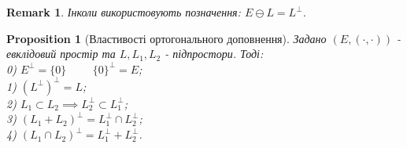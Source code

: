 \documentclass[a4paper, 10pt]{article}
\theoremstyle{theoremdd}
\newtheorem{proposition}[theorem]{Proposition}
\newtheorem{remark}[theorem]{Remark}
\begin{document}
\begin{remark}
Інколи використовують позначення: $E \ominus L = L^{\perp}$.
\end{remark}

\begin{proposition}[Властивості ортогонального доповнення]
Задано $(E,(\cdot,\cdot))$ - евклідовий простір та $L,L_1,L_2$ - підпростори. Тоді:\\
0) $E^{\perp} = \{0\} \hspace{1cm} \{0\}^{\perp} = E$;\\
1) $(L^{\perp})^{\perp} = L$;\\
2) $L_1 \subset L_2 \implies L_2^{\perp} \subset L_1^{\perp}$;\\
3) $(L_1+L_2)^{\perp} = L_1^{\perp} \cap L_2^{\perp}$;\\
4) $(L_1 \cap L_2)^{\perp} = L_1^{\perp} + L_2^{\perp}$.\\
\end{proposition}
\end{document}
